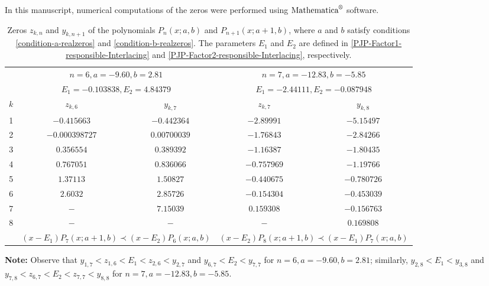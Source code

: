 \documentclass[final,3p,times,12pt]{elsarticle}
\numberwithin{equation}{section}  %
\begin{document}
In this manuscript, numerical computations of the zeros were performed using $\text{Mathematica}^{\text{\textregistered}}$ software. 
	
	
	
	
	\begin{table}[H]
	\centering
	\caption{Zeros $z_{k,n}$ and $y_{k,n+1}$ of the polynomials $P_{n}(x;a,b)$ and $P_{n+1}(x;a+1,b)$, where $a$ and $b$ satisfy conditions \eqref{condition-a-realzeros} and \eqref{condition-b-realzeros}. The parameters $E_1$ and $E_2$ are defined in \eqref{PJP-Factor1-responsible-Interlacing} and \eqref{PJP-Factor2-responsible-Interlacing}, respectively.}
	\label{tab4:Interlacingzeros1_PseudoJacobi}
	\footnotesize 
	\setlength{\tabcolsep}{12pt} 
	\begin{tabular}{@{}c cc | cc@{}}
		\toprule
		
		\addlinespace[2pt]
		& \multicolumn{2}{c|}{$n=6, a=-9.60, b=2.81$} & \multicolumn{2}{c}{$n=7, a=-12.83, b=-5.85$} \\
		& \multicolumn{2}{c|}{$E_1 = -0.103838, E_2=4.84379$} & \multicolumn{2}{c}{$E_1=-2.44111, E_2=-0.087948$} \\
		\midrule
		$k$ & $z_{k,6}$ & $y_{k,7}$ & $z_{k,7}$ & $y_{k,8}$ \\
		\midrule
		
		1 & $-0.415663$ & $-0.442364$ & $-2.89991$ & $-5.15497$ \\
		2 & $-0.000398727$ & $0.00700039$ & $-1.76843$ & $-2.84266$ \\
		3 & $0.356554$ & $0.389392$ & $-1.16387$ & $-1.80435$ \\
		4 & $0.767051$ & $0.836066$ & $-0.757969$ & $-1.19766$ \\
		5 & $1.37113$ & $1.50827$ & $-0.440675$ & $-0.780726$ \\
		6 & $2.6032$ & $2.85726$ & $-0.154304$ & $-0.453039$ \\
		7 & $-$ & $7.15039$ & $0.159308$ & $-0.156763$ \\
		8 & $-$ & $-$ & $-$ & $0.169808$ \\
		\midrule
		& \multicolumn{2}{c|}{$(x-E_1)P_{7}(x;a+1,b)\prec (x-E_2) P_{6}(x;a,b)$} & \multicolumn{2}{c}{$(x-E_2)P_{8}(x;a+1,b)\prec (x-E_1) P_{7}(x;a,b)$} \\
		\bottomrule
		
	\end{tabular}
	
	\vspace{0.2cm}
	\begin{minipage}{0.9\textwidth}
		\footnotesize
		\textbf{Note:} Observe that $y_{1,7}<z_{1,6}<E_1 < z_{2,6}<y_{2,7}$ and $y_{6,7}<E_2 < y_{7,7}$ for $n=6, a=-9.60, b=2.81$; similarly, $y_{2,8}<E_1<y_{3,8}$ and $y_{7,8}<z_{6,7}<E_2 < z_{7,7}<y_{8,8}$ for $n=7, a=-12.83, b=-5.85$.
	\end{minipage}
	\end{table}	
	
\end{document}
